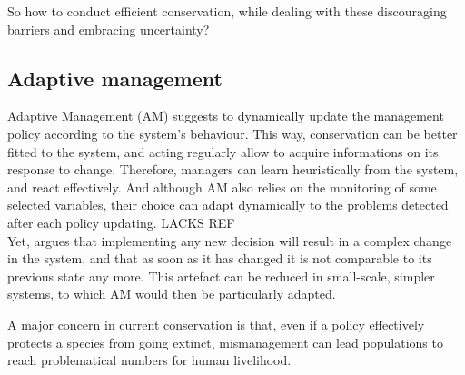 \documentclass[12pt,a4paper]{article}
\begin{document}
So how to conduct efficient conservation, while dealing with these discouraging barriers and embracing uncertainty?

\subsection{Adaptive management}
%

Adaptive Management (AM) suggests to dynamically update the management policy according to the system's behaviour.
This way, conservation can be better fitted to the system, and acting regularly allow to acquire informations on its response to change.
Therefore, managers can learn heuristically from the system, and react effectively.
And although AM also relies on the monitoring of some selected variables, their choice can adapt dynamically to the problems detected after each policy updating.
LACKS REF\\
%
%
Yet, \cite{game2013conservation} argues that implementing any new decision will result in a complex change in the system, and that as soon as it has changed it is not comparable to its previous state any more.
This artefact can be reduced in small-scale, simpler systems, to which AM would then be particularly adapted.
%

A major concern in current conservation is that, even if a policy effectively protects a species from going extinct, mismanagement can lead populations to reach problematical numbers for human livelihood.
\end{document}
